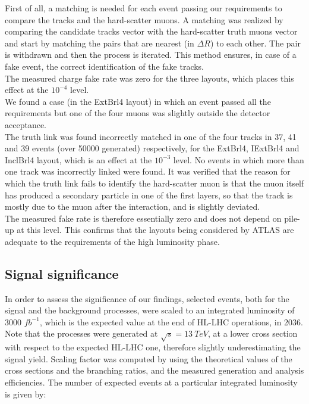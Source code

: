 \documentclass[a4paper,twoside,12pt]{book}
\begin{document}
First of all, a matching is needed for each event passing our requirements to compare 
the tracks and the hard-scatter muons. A matching was realized by comparing the candidate
tracks vector with the hard-scatter truth muons vector and start by matching the pairs
that are nearest (in $\Delta R$) to each other. The pair is withdrawn and then the process
is iterated. This method ensures, in case of a fake event, the correct
identification of the fake tracks. \\

The measured charge fake rate was zero for the three layouts, which places this
effect at the $10^{-4}$ level. \\

We found a case (in the ExtBrl4 layout) 
in which an event passed all the requirements but one of the four muons was slightly outside the detector acceptance.\\

The truth link was found incorrectly matched in one of the
four tracks in 37, 41 and 39 events (over 50000 generated) respectively, for the ExtBrl4, IExtBrl4
and InclBrl4 layout, which is an effect at the $10^{-3}$ level. No events in which more than one
track was incorrectly linked were found.  It was verified that the reason for which 
the truth link fails to identify the hard-scatter muon is that the muon itself has produced
a secondary particle in one of the first layers, so that the track is mostly due to the muon
after the interaction, and is slightly deviated.\\

The measured fake rate is therefore essentially zero and does not depend on pile-up at this level.
This confirms that the layouts being considered by ATLAS are adequate to the requirements of the high
luminosity phase.

\subsection*{Signal significance}
In order to assess the significance of our findings, selected events, both for the signal and the background processes, were
scaled to an integrated luminosity of 3000 $fb^{-1}$, which is the expected
value at the end of HL-LHC operations, in 2036. Note that the processes
were generated at $\sqrt{s} = 13\ TeV$, at a lower cross section with respect
to the expected HL-LHC one, therefore slightly underestimating the signal yield. Scaling factor was
computed by using the theoretical values of the cross sections and the branching ratios,
and the measured generation and analysis efficiencies. The number of expected
events at a particular integrated luminosity is given by: 
\end{document}

